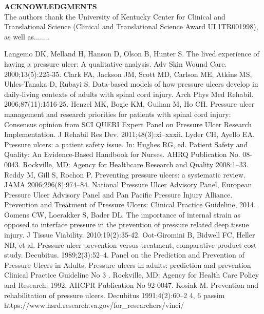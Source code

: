 \documentclass{amia}
\begin{document}

\textbf{ACKNOWLEDGMENTS}\\
The authors thank the University of Kentucky Center for Clinical and Translational Science (Clinical and Translational Science Award UL1TR001998), as well as........

\makeatletter
\renewcommand{\@biblabel}[1]{\hfill #1.}
\makeatother



{\footnotesize

\begin{thebibliography}{1}
\setlength\itemsep{-0.1em}

Langemo DK, Melland H, Hanson D, Olson B, Hunter S. The lived experience of having a pressure ulcer: A qualitative analysis. Adv Skin Wound Care. 2000;13(5):225-35.
Clark FA, Jackson JM, Scott MD, Carlson ME, Atkins MS, Uhles-Tanaka D, Rubayi S. Data-based models of how pressure ulcers develop in daily-living contexts of adults with spinal cord injury. Arch Phys Med Rehabil. 2006;87(11):1516-25.
Henzel MK, Bogie KM, Guihan M, Ho CH. Pressure ulcer management and research priorities for patients with spinal cord injury: Consensus opinion from SCI QUERI Expert Panel on Pressure Ulcer Research Implementation. J Rehabil Res Dev. 2011;48(3):xi–xxxii.
Lyder CH, Ayello EA. Pressure ulcers: a patient safety issue. In: Hughes RG, ed. Patient Safety and Quality: An Evidence-Based Handbook for Nurses. AHRQ Publication No. 08-0043. Rockville, MD: Agency for Healthcare Research and Quality 2008:1–33.
Reddy M, Gill S, Rochon P. Preventing pressure ulcers: a systematic review. JAMA 2006;296(8):974–84.
National Pressure Ulcer Advisory Panel, European Pressure Ulcer Advisory Panel and Pan Pacific Pressure Injury Alliance. Prevention and Treatment of Pressure Ulcers: Clinical Practice Guideline, 2014.
Oomens CW, Loerakker S, Bader DL. The importance of internal strain as opposed to interface pressure in the prevention of pressure related deep tissue injury. J Tissue Viability. 2010;19(2):35-42.
Oot-Giromini B, Bidwell FC, Heller NB, et al. Pressure ulcer prevention versus treatment, comparative product cost study. Decubitus. 1989;2(3):52–4.
Panel on the Prediction and Prevention of Pressure Ulcers in Adults. Pressure ulcers in adults: prediction and prevention Clinical Practice Guideline No 3 . Rockville, MD: Agency for Health Care Policy and Research; 1992. AHCPR Publication No 92-0047.
Kosiak M. Prevention and rehabilitation of pressure ulcers. Decubitus 1991;4(2):60–2 4, 6 passim
https://www.hsrd.research.va.gov/for\_researchers/vinci/


\end{thebibliography}}
\end{document}
